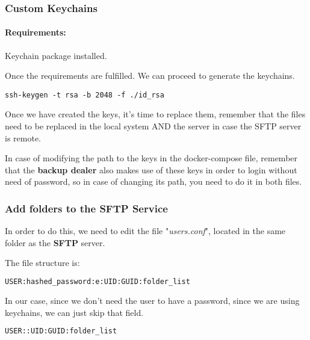 \subsubsection[Custom Keychains]{Custom Keychains}
\paragraph{Requirements:} Keychain package installed.
\begin{flushleft}

    Once the requirements are fulfilled.
    We can proceed to generate the keychains.
    \begin{lstlisting}[label={lst:generating_keychain,language=bash}]
ssh-keygen -t rsa -b 2048 -f ./id_rsa
    \end{lstlisting}
\end{flushleft}
\begin{flushleft}
    Once we have created the keys, it's time to replace them, remember that the files need to be replaced in the local
    system AND the server in case the SFTP server is remote.
\end{flushleft}
\begin{flushleft}
    In case of modifying the path to the keys in the docker-compose file, remember that the \textbf{backup dealer} also
    makes use of these keys in order to login without need of password, so in case of changing its path, you need to do
    it in both files.
\end{flushleft}
%

\subsubsection[Add folders to the SFTP Service]{Add folders to the SFTP Service}
\begin{flushleft}
    In order to do this, we need to edit the file "\textit{users.conf}", located in the same folder as the \textbf{SFTP} server.
    
    The file structure is:

\begin{lstlisting}[language=bash,label={lst:users.conf_hash_structure}]
USER:hashed_password:e:UID:GUID:folder_list
\end{lstlisting}
    In our case, since we don't need the user to have a password, since we are using keychains, we can just skip that field.
    \begin{lstlisting}[language=bash,label={lst:users.conf_structure}]
USER::UID:GUID:folder_list
    \end{lstlisting}
\end{flushleft}


